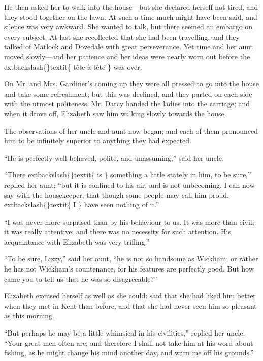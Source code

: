\documentclass[10pt]{book}
\begin{document}
   He then asked her to walk into the house—but she declared herself not
tired, and they stood together on the lawn. At such a time much might
have been said, and silence was very awkward. She wanted to talk, but
there seemed an embargo on every subject. At last she recollected that
she had been travelling, and they talked of Matlock and Dovedale with
great perseverance. Yet time and her aunt moved slowly—and her patience
and her ideas were nearly worn out before the
   	extbackslash\{\}textit\{
    tête-à-tête
   \}
   was over.
  

   On Mr. and Mrs. Gardiner’s coming up they were all pressed to go into
the house and take some refreshment; but this was declined, and they
parted on each side with the utmost politeness. Mr. Darcy handed the
ladies into the carriage; and when it drove off, Elizabeth saw him
walking slowly towards the house.
  

   The observations of her uncle and aunt now began; and each of them
pronounced him to be infinitely superior to anything they had expected.
  

   “He is perfectly well-behaved, polite, and unassuming,” said her uncle.
  

   “There
   	extbackslash\{\}textit\{
    is
   \}
   something a little stately in him, to be sure,” replied her
aunt; “but it is confined to his air, and is not unbecoming. I can now
say with the housekeeper, that though some people may call him proud,
   	extbackslash\{\}textit\{
    I
   \}
   have seen nothing of it.”
  

   “I was never more surprised than by his behaviour to us. It was more
than civil; it was really attentive; and there was no necessity for such
attention. His acquaintance with Elizabeth was very trifling.”
  

   “To be sure, Lizzy,” said her aunt, “he is not so handsome as Wickham;
or rather he has not Wickham’s countenance, for his features are
perfectly good. But how came you to tell us that he was so
disagreeable?”
  

   Elizabeth excused herself as well as she could: said that she had liked
him better when they met in Kent than before, and that she had never
seen him so pleasant as this morning.
  

   “But perhaps he may be a little whimsical in his civilities,” replied
her uncle. “Your great men often are; and therefore I shall not take him
at his word about fishing, as he might change his mind another day, and
warn me off his grounds.”
  
\end{document}
